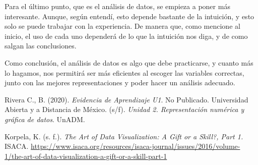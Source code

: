 \documentclass[12pt]{article}
\begin{document}
	\par Para el último punto, que es el análisis de datos, se empieza a poner más interesante. Aunque, según entendí, esto depende bastante de la intuición, y esto solo se puede trabajar con la experiencia. De manera que, como mencione al inicio, el uso de cada uno dependerá de lo que la intuición nos diga, y de como salgan las conclusiones.
	
	\par Como conclusión, el análisis de datos es algo que debe practicarse, y cuanto más lo hagamos, nos permitirá ser más eficientes al escoger las variables correctas, junto con las mejores representaciones y poder hacer un análisis adecuado.
	

\begin{thebibliography}{X}
	 Rivera C., B. (2020). \textit{Evidencia de Aprendizaje U1}. No Publicado.
	 Universidad Abierta y a Distancia de México. (s/f). \textit{Unidad 2. Representación numérica y gráfica de datos}. UnADM.

	 Korpela, K. (s. f.). \textit{The Art of Data Visualization: A Gift or a Skill?, Part 1. } ISACA. \url{https://www.isaca.org/resources/isaca-journal/issues/2016/volume-1/the-art-of-data-visualization-a-gift-or-a-skill-part-1}
 
\end{thebibliography}
\end{document}

